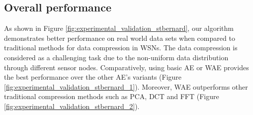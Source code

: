 \documentclass[a4paper,onecolumn,conference]{IEEEtran}
\begin{document}
\begin{figure*}
\begin{centering}
\enskip{}\enskip{}
\par\end{centering}
\vspace{-3mm}

\caption{\label{fig:experimental_validation_stbernard}{\small{}Experimental results and validation of the spatial and temporal compression techniques.}}
\end{figure*}

\subsection{Overall performance}

As shown in Figure \ref{fig:experimental_validation_stbernard}, our algorithm demonstrates better performance on real world data sets when compared to traditional methods for data compression in WSNs. The data compression is considered as a challenging task due to the non-uniform data distribution through different sensor nodes. Comparatively, using basic AE or WAE provides the best performance over the other AE's variants (Figure \ref{fig:experimental_validation_stbernard_1}). Moreover, WAE outperforms other traditional compression methods such as PCA, DCT and FFT (Figure \ref{fig:experimental_validation_stbernard_2}).
\end{document}
